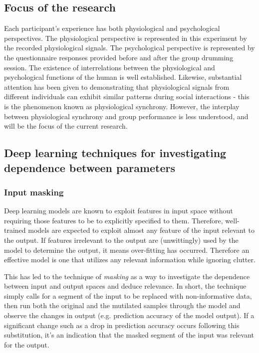 \documentclass[a4paper, 11pt]{article}      %
\begin{document}
\subsection{Focus of the research}
Each participant's experience has both physiological and psychological perspectives. The physiological perspective is represented in this experiment by the recorded physiological signals. The psychological perspective is represented by the questionnaire responses provided before and after the group drumming session. The existence of interrelations between the physiological and psychological functions of the human is well established. Likewise, substantial attention has been given to demonstrating that physiological signals from different individuals can exhibit similar patterns during social interactions - this is the phenomenon known as physiological synchrony. However, the interplay between physiological synchrony and group performance is less understood, and will be the focus of the current research.

\subsection{Deep learning techniques for investigating dependence between parameters}
\subsubsection{Input masking}
Deep learning models are known to exploit features in input space without requiring those features to be to explicitly specified to them. Therefore, well-trained models are expected to exploit almost any feature of the input relevant to the output. If features irrelevant to the output are (unwittingly) used by the model to determine the output, it means over-fitting has occurred. Therefore an effective model is one that utilizes any relevant information while ignoring clutter. 

This has led to the technique of \emph{masking} as a way to investigate the dependence between input and output spaces and deduce relevance. In short, the technique simply calls for a segment of the input to be replaced with non-informative data, then run both the original and the mutilated samples through the model and observe the changes in output (e.g. prediction accuracy of the model output). If a significant change such as a drop in prediction accuracy occurs following this substitution, it's an indication that the masked segment of the input was relevant for the output.
\end{document}
